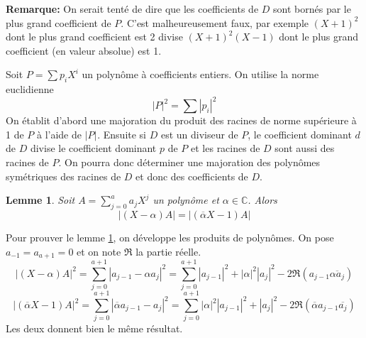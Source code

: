 \documentclass[a4paper,11pt]{article}
\newtheorem{lemma}[thm]{Lemme}
\begin{document}
\begin{giacjshere}
{\bf{Remarque:}} On serait tenté de dire que les coefficients de $D$
sont bornés par le plus grand coefficient de $P$. C'est malheureusement faux,
par exemple $( X + 1 )^2$ dont le plus grand coefficient est 2 divise $( X + 1
)^2 ( X - 1 )$ dont le plus grand coefficient (en valeur absolue) est 1.

Soit $P = \sum p_i X^i$ un polynôme à coefficients entiers. On utilise la
norme euclidienne
\begin{equation}
  | P |^2 = \sum | p_i |^2
\end{equation}
On établit d'abord une majoration du produit des racines de norme supérieure à
1 de $P$ à l'aide de $| P |^{}$. Ensuite si $D$ est un diviseur de $P$, le
coefficient dominant $d$ de $D$ divise le coefficient dominant $p$ de $P$ et 
les racines de $D$ sont aussi des racines de $P$. On pourra donc déterminer une
majoration des polynômes symétriques des racines de $D$ et donc des
coefficients de $D$.

\begin{lemma} \label{lemme:A}
  Soit $A = \sum_{j = 0}^a a_j X^j$ un polynôme et $\alpha \in \mathbb{C}$.
  Alors
  \[ | ( X - \alpha ) A | = | ( \overline{\alpha} X - 1 ) A | \]
\end{lemma}

Pour prouver le lemme \ref{lemme:A}, on développe les produits de polynômes. 
On pose $a_{-1} = a_{a + 1} = 0$ et on note $\Re$ la partie réelle.
\[ | ( X - \alpha ) A |^2 = \sum_{j = 0}^{a + 1} | a_{j - 1} - \alpha
   a_j |^2 = \sum_{j = 0}^{a + 1} | a_{j - 1} |^2 + | \alpha |^2 | a_j |^2 - 2
   \Re ( a_{j - 1} \overline{\alpha  a_j} ) \]
\[ | (  \overline{\alpha} X - 1 ) A |^2 = \sum_{j = 0}^{a + 1} | 
\overline{\alpha} a_{j - 1}
   - a_j |^2 = \sum_{j = 0}^{a + 1} | \alpha |^2 | a_{j - 1} |^2 + | a_j |^2 -
   2 \Re ( \overline{\alpha}  a_{j - 1}   \overline{a_j} ) \]
Les deux donnent bien le même résultat.


\end{giacjshere}
\end{document}
